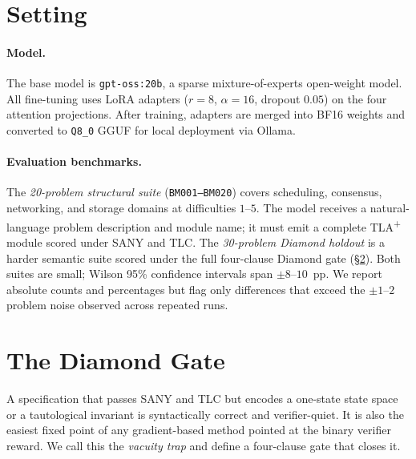 \documentclass[10pt,twocolumn]{article}
\begin{document}
\section{Setting}
\label{sec:setting}

\paragraph{Model.}
The base model is \texttt{gpt-oss:20b}, a sparse mixture-of-experts
open-weight model.
All fine-tuning uses LoRA adapters ($r\!=\!8$, $\alpha\!=\!16$, dropout $0.05$)
on the four attention projections.
After training, adapters are merged into BF16 weights and converted to
\texttt{Q8\_0} GGUF for local deployment via Ollama.

\paragraph{Evaluation benchmarks.}
The \emph{20-problem structural suite} (\texttt{BM001--BM020}) covers
scheduling, consensus, networking, and storage domains at difficulties $1$--$5$.
The model receives a natural-language problem description and module name;
it must emit a complete TLA\textsuperscript{+} module scored under SANY and TLC.
The \emph{30-problem Diamond holdout} is a harder semantic suite scored under
the full four-clause Diamond gate (\S\ref{sec:diamond}).
Both suites are small; Wilson 95\% confidence intervals span $\pm 8$--$10$~pp.
We report absolute counts and percentages but flag only differences that exceed
the $\pm 1$--$2$ problem noise observed across repeated runs.

\section{The Diamond Gate}
\label{sec:diamond}

A specification that passes SANY and TLC but encodes a one-state state space
or a tautological invariant is syntactically correct and verifier-quiet.
It is also the easiest fixed point of any gradient-based method pointed at the
binary verifier reward.
We call this the \emph{vacuity trap} and define a four-clause gate that closes
it.
\end{document}
